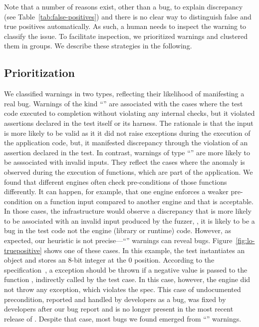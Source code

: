 \documentclass[10pt,conference,anonymous]{IEEEtran}
\begin{document}

Note that a number of reasons exist, other than a bug, to explain
discrepancy (see Table~\ref{tab:false-positives}) and there is no
clear way to distinguish false and true positives automatically. As
such, a human needs to inspect the warning to classify the issue. To
facilitate inspection, we prioritized warnings and clustered them in
groups. We describe these strategies in the following.

\subsection{Prioritization}

We classified warnings in two types,
reflecting their likelihood of manifesting a real bug. Warnings of the
kind ``\hi{}'' are associated with the cases where the test code
executed to completion without violating any internal checks, but it
violated assertions declared in the test itself or its harness. The
rationale is that the input is more likely to be valid as it it did
not raise exceptions during the execution of the application code,
but, it manifested discrepancy through the violation of an assertion
declared in the test. In contrast, warnings of type ``\lo{}'' are
more likely to be asssociated with invalid inputs. They reflect the
cases where the anomaly is observed during the execution of functions,
which are part of the application. We found that different engines
often check pre-conditions of those functions differently. It can
happen, for example, that one engine enforces a weaker pre-condition
on a function input compared to another engine and that is
acceptable. In those cases, the infrastructure would observe a
discrepancy that is more likely to be associated with an invalid input
produced by the fuzzer, \ie{}, it is likely to be a bug in the test
code not the engine (library or runtime) code. However, as expected, our heuristic
is not precise---``\lo'' warnings can 
reveal bugs. Figure~\ref{fig:lo-truepositive} shows one of these
cases. In this example, the test instantiates an 
object and stores an 8-bit integer at the 0 position. According to the
specification~\cite{ecmas262-getviewvalue}, a 
exception should be thrown if a negative value is passed to the
function , indirectly called by the test case. In this
case, however, the \chakra{} engine did not throw any exception, which
violates the spec. This case of undocumented precondition, reported
and handled by developers as a bug, was fixed by developers after our bug
report and is no longer present in the most recent release of
\chakra. Despite that case, most bugs we found emerged from
``\hi{}'' warnings.
\end{document}
